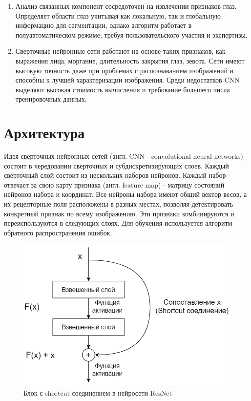 \documentclass[12pt, letterpaper]{article}
\begin{document}
\begin{enumerate}
        \item Анализ связанных компонент сосредоточен на извлечении признаков глаз. Определяет области глаз учитывая как локальную, так и глобальную информацию для сегментации, однако алгоритм работает в полуавтоматическом режиме, требуя пользовательского участия и экспертизы.
        \item Сверточные нейронные сети работают на основе таких признаков, как выражения лица, моргание, длительность закрытия глаз, зевота. Сети имеют высокую точность даже при проблемах с распознаванием изображений и способны к лучшей характеризации изображения. Среди недостатков CNN выделяют высокая стоимость вычисления и требование большего числа тренировочных данных.
    \end{enumerate}
    
\section{Архитектура}\label{sec:architecture}    
   
    Идея сверточных нейронных сетей (англ. CNN - convolutional neural networks) состоит в чередовании сверточных и субдискретизирующих слоев. Каждый сверточный слой состоит из нескольких наборов нейронов. Каждый набор отвечает за свою карту признака (англ. feature map) - матрицу состояний нейронов набора и координат. Все нейроны набора имеют общий вектор весов, а их рецепторные поля расположены в разных местах, позволяя детектировать конкретный признак по всему изображению. Эти признаки комбинируются и переиспользуются в следующих слоях. Для обучения используется алгоритм обратного распространения ошибок\cite{bengio_convolutional_1997}.

    \begin{figure}[H]
        \centering
        \includegraphics[width=0.7\linewidth]{ResNet_scheme.png}
        \caption{Блок с shortcut соединением в нейросети ResNet}
        \label{fig:ResNet_scheme}
    \end{figure}
\end{document}

